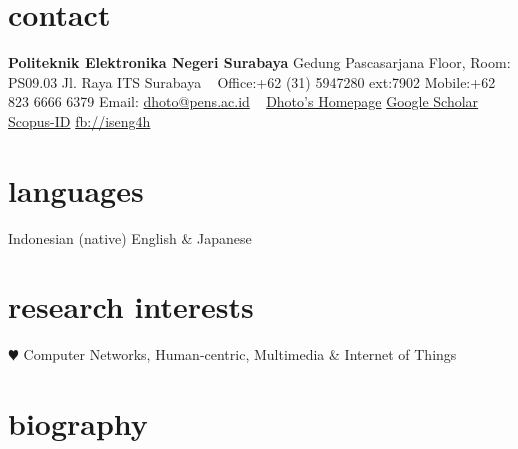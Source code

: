 \documentclass[]{friggeri-cv} %
\begin{document}


\begin{aside} %
\section{contact}
\textbf{Politeknik Elektronika Negeri Surabaya}
Gedung Pascasarjana  Floor, Room: PS09.03
Jl. Raya ITS Surabaya
~
Office:+62 (31) 5947280 ext:7902
Mobile:+62 823 6666 6379
Email: \href{mailto:dhoto@pens.ac.id}{dhoto@pens.ac.id}
~
\href{http://dhoto.lecturer.pens.ac.id/}{Dhoto's Homepage}
\href{https://scholar.google.co.id/citations?user=M6sGfNQAAAAJ&hl=en&oi=ao}{Google Scholar}
\href{https://www.scopus.com/authid/detail.uri?authorId=35100882700}{Scopus-ID}
\href{http://facebook.com/iseng4h}{fb://iseng4h}
\section{languages}
Indonesian (native)
English \& Japanese 
\section{research interests}
{\color{red} $\varheartsuit$} Computer Networks,
Human-centric, Multimedia \& Internet of Things
\end{aside}


\section{biography}
\end{document}
